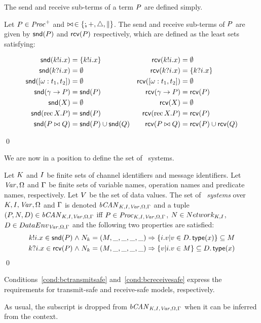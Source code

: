 The send and receive sub-terms of a term $\P$ are defined simply.
\begin{definition}[$\snd(\P), \rcv(\P)$]
Let $\P \in \ProcO{}$ and $\genop\, \in \{\sq,\choice,\interrupt,\parallel\}$. 
The send and receive sub-terms 
of $\P$ are given by $\snd(\P)$ and $\rcv(\P)$ respectively, which are defined
as the least sets satisfying:
\begin{small}
\begin{alignat*}{2}
\snd(\kk!\ii.\xx) & = \{\kk!\ii.\xx\} & 
\rcv(\kk!\ii.\xx) & = \emptyset \\ 
\snd(\kk?\ii.\xx) & = \emptyset & 
\rcv(\kk?\ii.\xx) & = \{\kk?\ii.\xx\} \\ 
\snd([\op:t_1,t_2]) & = \emptyset & 
\rcv([\op:t_1,t_2]) & = \emptyset \\ 
\snd(\g \guard \P) & = \snd(\P) &
\rcv(\g \guard \P) & = \rcv(\P) \\
\snd(X) & = \emptyset & 
\rcv(X) & = \emptyset \\ 
\snd(\rec X.\P) & = \snd(\P) &
\rcv(\rec X.\P) & = \rcv(\P) \\
\snd(\P \genop \Q) & = \snd(\P) \cup \snd(\Q) & 
\rcv(\P \genop \Q) & = \rcv(\P) \cup \rcv(\Q)  
\end{alignat*}
\end{small}
\qed
\end{definition}
  
We are now in a position to define the set of \bcandle\ systems.
\begin{definition}
Let $\K$ and $\I$ be finite sets of channel identifiers and message
identifiers. Let $\Var, \Op$ and $\G$ be finite sets of variable
names, operation names and predicate names, respectively. Let $\V$ be
the set of data values. The set of \emph{\bcandle\ systems} over $\K, \I,
\Var, \Op$ and $\G$ is denoted $\Sys{\K,\I,\Var,\Op,\G}$ and a tuple
$(\P,\N,\D) \in \Sys{\K,\I,\Var,\Op,\G}$ iff $\P \in
\Proc{\K,\I,\Var,\Op,\G}$, $\N \in \Network{\K,\I}$, $\D \in
\DataEnv{\Var,\Op,\G}$ and the following two properties are satisfied:
\begin{eqnarray}
\kk!\ii.\xx \in \snd(\P) \land \N_\kk = (\M,\_,\_,\_,\_) \implies
  \{\ii.\vv | v \in \D.\type(\xx)\} \subseteq \M \label{cond:bctransmitsafe}\\
\kk?\ii.\xx \in \rcv(\P) \land \N_\kk = (\M,\_,\_,\_,\_) \implies
  \{\vv | \ii.\vv \in \M\} \subseteq \D.\type(\xx) \label{cond:bcreceivesafe}
\end{eqnarray}
\qed
\end{definition}
Conditions~\ref{cond:bctransmitsafe} and~\ref{cond:bcreceivesafe} express
the requirements for transmit-safe and receive-safe models, respectively.
\begin{notation}
As usual, the subscript is dropped from 
$\Sys{\K,\I,\Var,\Op,\G}$ when it can be inferred from the 
context.
\end{notation}

